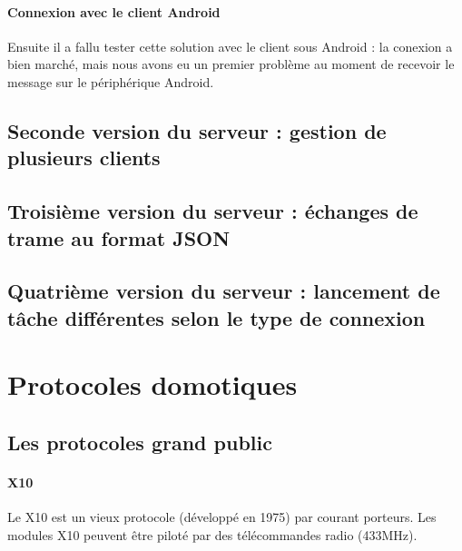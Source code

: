 \documentclass[a4paper,10pt]{article}
\begin{document}
\paragraph{Connexion avec le client Android}
Ensuite il a fallu tester cette solution avec le client sous Android : la conexion a bien marché, mais nous avons eu un premier problème au moment de recevoir le message sur le périphérique Android.

\subsection{Seconde version du serveur : gestion de plusieurs clients}

\subsection{Troisième version du serveur : échanges de trame au format JSON}

\subsection{Quatrième version du serveur : lancement de tâche différentes selon le type de connexion}


\section{Protocoles domotiques}

\subsection{Les protocoles grand public}
\paragraph{X10}
Le X10 est un vieux protocole (développé en 1975) par courant porteurs.  Les modules X10 peuvent être piloté par des télécommandes radio (433MHz). 
\end{document}
